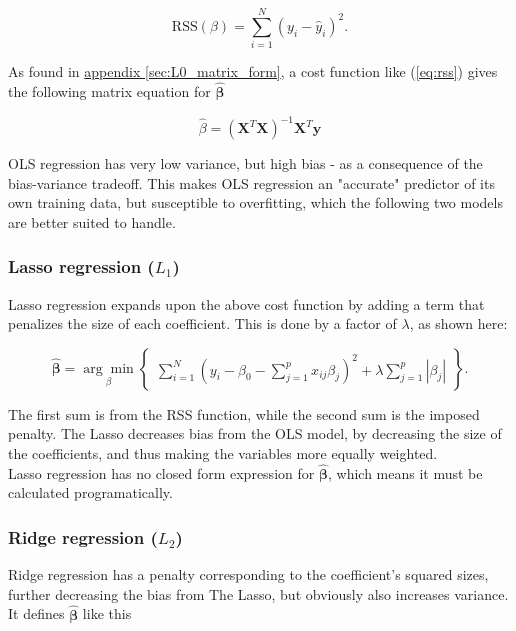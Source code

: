 \documentclass[../main.tex]{subfiles}
\begin{document}
\begin{equation}
  \label{eq:rss}
  \text{RSS}(\beta) = \sum_{i=1}^N (y_i - \hat y_i)^2.
\end{equation}

As found in \hyperref[sec:L0_matrix_form]{appendix \ref*{sec:L0_matrix_form}}, a cost function like (\ref{eq:rss}) gives the following matrix equation for $\hat{\mathbf \beta}$

\begin{equation}
  \label{eq:L0_matrix_form}
  \hat \beta = (\mathbf X^T\mathbf X)^{-1}\mathbf X^T \mathbf y
\end{equation}

OLS regression has very low variance, but high bias - as a consequence of the bias-variance tradeoff. This makes OLS regression an "accurate" predictor of its own training data, but susceptible to overfitting, which the following two models are better suited to handle.


\subsubsection{Lasso regression ($L_1$)}
Lasso regression expands upon the above cost function by adding a term that penalizes the size of each coefficient. This is done by a factor of $\lambda$, as shown here:

\begin{equation}
  \label{eq:L1_algo}
  \hat{\mathbf \beta} = \underset{\beta}{\arg \min} \begin{Bmatrix}\sum_{i=1}^N\left(y_i - \beta_0 - \sum_{j=1}^p x_{ij}\beta_j\right)^2 + \lambda \sum_{j=1}^p |\beta_j| \end{Bmatrix} .
\end{equation}

The first sum is from the RSS function, while the second sum is the imposed penalty. The Lasso decreases bias from the OLS model, by decreasing the size of the coefficients, and thus making the variables more equally weighted. \\

Lasso regression has no closed form expression for $\hat{\mathbf \beta}$, which means it must be calculated programatically.


\subsubsection{Ridge regression ($L_2$)}
Ridge regression has a penalty corresponding to the coefficient's squared sizes, further decreasing the bias from The Lasso, but obviously also increases variance. It defines $\hat{\mathbf \beta}$ like this
\end{document}
